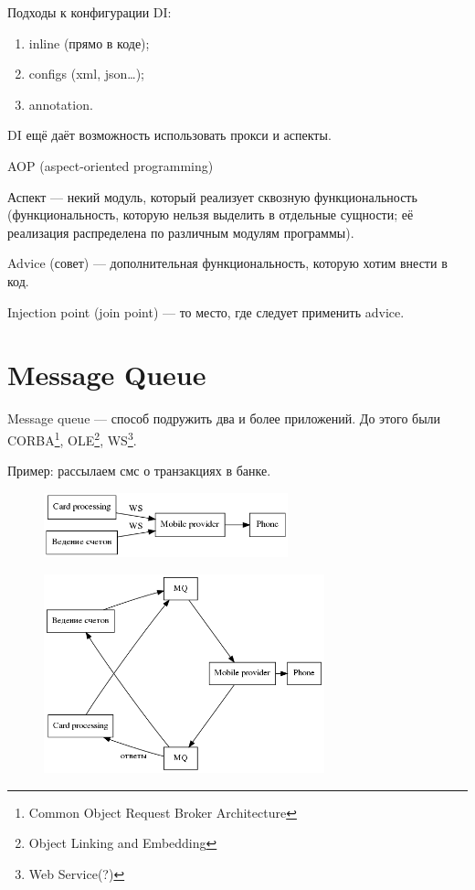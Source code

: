 \documentclass[11pt,a4paper]{article}
\begin{document}
Подходы к конфигурации DI:
\begin{enumerate}
\item inline (прямо в коде);
\item configs (xml, json…);
\item annotation.
\end{enumerate}

DI ещё даёт возможность использовать прокси и аспекты.

AOP (aspect-oriented programming)

Аспект — некий модуль, который реализует сквозную функциональность (функциональность, которую нельзя выделить в отдельные сущности; её реализация распределена по различным модулям программы).

Advice (совет) — дополнительная функциональность, которую хотим внести в код.

Injection point (join point) — то место, где следует применить advice.

\section{Message Queue}
Message queue — способ подружить два и более приложений. До этого были CORBA\footnote{Common Object Request Broker Architecture}, OLE\footnote{Object Linking and Embedding}, WS\footnote{Web Service(?)}.

Пример: рассылаем смс о транзакциях в банке.

\begin{figure}[H]
	\centering
	\begin{minipage}{.5\textwidth}
		\centering
		\includegraphics[width=200pt]{pics/ws.png}
		\label{fig:ws}
	\end{minipage}%
	\begin{minipage}{.5\textwidth}
		\centering
		\includegraphics[width=230pt]{pics/mq.png}
		\label{fig:mq}
	\end{minipage}
\end{figure}
\end{document}
